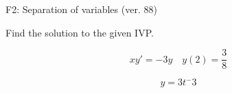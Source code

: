 \begin{exercise}
  \begin{exerciseTitle}F2: Separation of variables (ver. 88)\end{exerciseTitle}
  \begin{exerciseStatement}
    
Find the solution to the given IVP.

    
\[xy'= -3 y \hspace{1em} y( 2 ) = \frac{3}{8}\]

  \end{exerciseStatement}
  \begin{exerciseAnswer}
    
\[y= 3 t^ -3\]

  \end{exerciseAnswer}
\end{exercise}